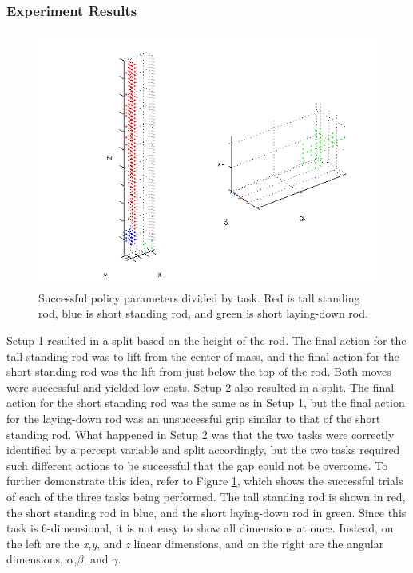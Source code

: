 \documentclass[12pt]{article}
\begin{document}
\subsubsection{Experiment Results}

\begin{figure}[ht]
  \centerline{
  \includegraphics[width=0.9\columnwidth]{6d.png}}
  \caption{\label{fig_6d} Successful policy parameters divided by task. Red is tall standing rod, blue is short standing rod, and green is short laying-down rod.}
  \label{fig:6d}
\end{figure}

Setup 1 resulted in a split based on the height of the rod. The final action for the tall standing rod was to lift from the center of mass, and the final action for the short standing rod was the lift from just below the top of the rod. Both moves were successful and yielded low costs. Setup 2 also resulted in a split. The final action for the short standing rod was the same as in Setup 1, but the final action for the laying-down rod was an unsuccessful grip similar to that of the short standing rod. What happened in Setup 2 was that the two tasks were correctly identified by a percept variable and split accordingly, but the two tasks required such different actions to be successful that the gap could not be overcome. To further demonstrate this idea, refer to Figure \ref{fig:6d}, which shows the successful trials of each of the three tasks being performed. The tall standing rod is shown in red, the short standing rod in blue, and the short laying-down rod in green. Since this task is 6-dimensional, it is not easy to show all dimensions at once. Instead, on the left are the \emph{x},\emph{y}, and \emph{z} linear dimensions, and on the right are the angular dimensions, \emph{$\alpha$},\emph{$\beta$}, and \emph{$\gamma$}. 
\end{document}
